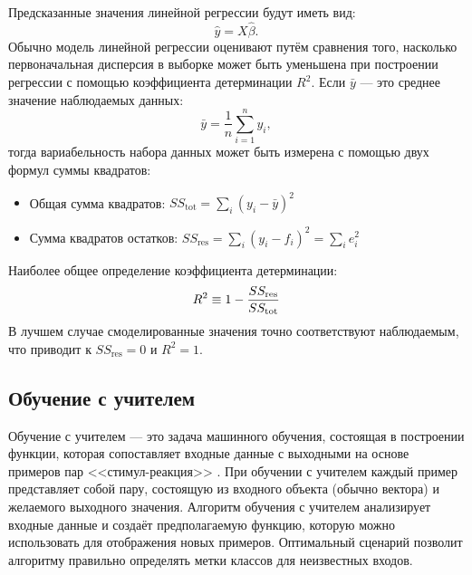 Предсказанные значения линейной регрессии будут иметь вид:
\begin{equation}
\label{eq:ols_y}
\hat{y} = X{\hat{\beta}}.
\end{equation}
Обычно модель линейной регрессии оценивают путём сравнения того, насколько первоначальная дисперсия в выборке может быть уменьшена при построении регрессии с помощью коэффициента детерминации $R^2$. Если $\bar{y}$ --- это среднее значение наблюдаемых данных:
\begin{equation}
\label{eq:ols_mean}
\bar{y} = {\frac{1}{n}} \sum_{i = 1}^{n} y_{i},
\end{equation}
тогда вариабельность набора данных может быть измерена с помощью двух формул суммы квадратов:
\begin{itemize}
	\item Общая сумма квадратов: $SS_{\text{tot}} = \sum_{i} (y_{i} - {\bar{y}})^{2}$
	\item Сумма квадратов остатков: $SS_{\text{res}} = \sum_{i} (y_{i}-f_{i})^{2} = \sum_{i} e_{i}^{2}$
\end{itemize}
Наиболее общее определение коэффициента детерминации:
\begin{equation}
\label{eq:ols_r2}
R^{2} \equiv 1- {SS_{\text{res}} \over SS_{\text{tot}}}
\end{equation}
В лучшем случае смоделированные значения точно соответствуют наблюдаемым, что приводит к $SS_{\text{res}} = 0$ и $R^{2} = 1$. 

\subsection{Обучение с учителем}\label{subsec:ch1/sec2/subsec2}

Обучение с учителем --- это задача машинного обучения, состоящая в построении функции, которая сопоставляет входные данные с выходными на основе примеров пар <<стимул-реакция>> \autocite{russell2010artificial}. При обучении с учителем каждый пример представляет собой пару, состоящую из входного объекта (обычно вектора) и желаемого выходного значения. Алгоритм обучения с учителем анализирует входные данные и создаёт предполагаемую функцию, которую можно использовать для отображения новых примеров. Оптимальный сценарий позволит алгоритму правильно определять метки классов для неизвестных входов. 


